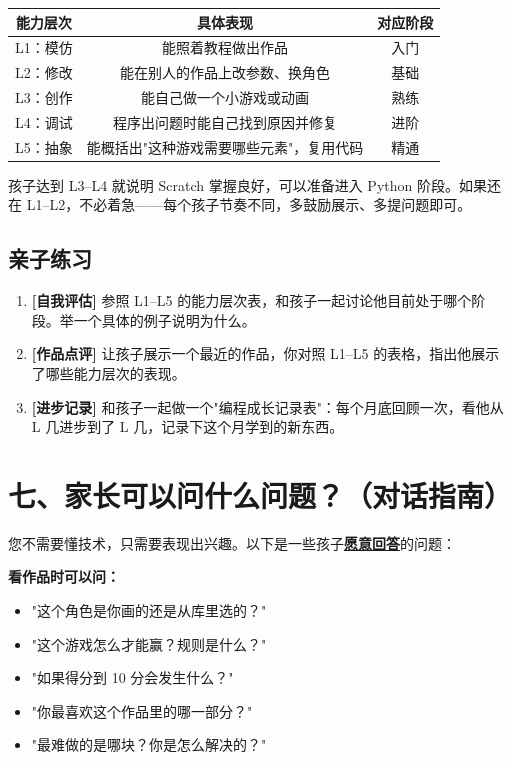 \documentclass[a4paper,12pt]{ctexart}
\begin{document}
\vspace{0.3cm}
\begin{center}
\begin{tabular}{|c|c|c|}
\hline
\textbf{能力层次} & \textbf{具体表现} & \textbf{对应阶段} \\ \hline
L1：模仿 & 能照着教程做出作品 & 入门 \\ \hline
L2：修改 & 能在别人的作品上改参数、换角色 & 基础 \\ \hline
L3：创作 & 能自己做一个小游戏或动画 & 熟练 \\ \hline
L4：调试 & 程序出问题时能自己找到原因并修复 & 进阶 \\ \hline
L5：抽象 & 能概括出"这种游戏需要哪些元素"，复用代码 & 精通 \\ \hline
\end{tabular}
\end{center}

孩子达到 L3--L4 就说明 Scratch 掌握良好，可以准备进入 Python 阶段。如果还在 L1--L2，不必着急——每个孩子节奏不同，多鼓励展示、多提问题即可。

\subsection*{亲子练习}

\begin{enumerate}
  \item \textbf{[自我评估]} 参照 L1--L5 的能力层次表，和孩子一起讨论他目前处于哪个阶段。举一个具体的例子说明为什么。
  \item \textbf{[作品点评]} 让孩子展示一个最近的作品，你对照 L1--L5 的表格，指出他展示了哪些能力层次的表现。
  \item \textbf{[进步记录]} 和孩子一起做一个"编程成长记录表"：每个月底回顾一次，看他从 L 几进步到了 L 几，记录下这个月学到的新东西。
\end{enumerate}

\section*{七、家长可以问什么问题？（对话指南）}

您不需要懂技术，只需要表现出兴趣。以下是一些孩子\underline{\textbf{愿意回答}}的问题：

\textbf{看作品时可以问：}
\begin{itemize}
  \item "这个角色是你画的还是从库里选的？"
  \item "这个游戏怎么才能赢？规则是什么？"
  \item "如果得分到 10 分会发生什么？"
  \item "你最喜欢这个作品里的哪一部分？"
  \item "最难做的是哪块？你是怎么解决的？"
\end{itemize}
\end{document}

